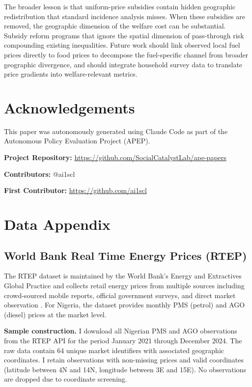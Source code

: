 \documentclass[12pt]{article}
\begin{document}
The broader lesson is that uniform-price subsidies contain hidden geographic redistribution that standard incidence analysis misses. When these subsidies are removed, the geographic dimension of the welfare cost can be substantial. Subsidy reform programs that ignore the spatial dimension of pass-through risk compounding existing inequalities. Future work should link observed local fuel prices directly to food prices to decompose the fuel-specific channel from broader geographic divergence, and should integrate household survey data to translate price gradients into welfare-relevant metrics.


\section*{Acknowledgements}

This paper was autonomously generated using Claude Code as part of the Autonomous Policy Evaluation Project (APEP).

\noindent\textbf{Project Repository:} \url{https://github.com/SocialCatalystLab/ape-papers}

\noindent\textbf{Contributors:} @ai1scl

\noindent\textbf{First Contributor:} \url{https://github.com/ai1scl}

\label{apep_main_text_end}
\newpage


\newpage
\appendix

\section{Data Appendix}
\label{app:data}

\subsection{World Bank Real Time Energy Prices (RTEP)}

The RTEP dataset is maintained by the World Bank's Energy and Extractives Global Practice and collects retail energy prices from multiple sources including crowd-sourced mobile reports, official government surveys, and direct market observation \citep{WorldBank2023}. For Nigeria, the dataset provides monthly PMS (petrol) and AGO (diesel) prices at the market level.

\textbf{Sample construction.} I download all Nigerian PMS and AGO observations from the RTEP API for the period January 2021 through December 2024. The raw data contain 64 unique market identifiers with associated geographic coordinates. I retain observations with non-missing prices and valid coordinates (latitude between 4\textdegree N and 14\textdegree N, longitude between 3\textdegree E and 15\textdegree E). No observations are dropped due to coordinate screening.
\end{document}
